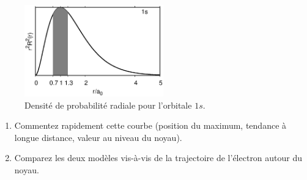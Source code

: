 \begin{figure}[h]
\begin{center}
\includegraphics[width=6cm]{figure/area_1s_3.eps}
\caption{Densit\'e de probabilit\'e radiale pour l'orbitale $1s$.}
\label{dens_prop}
\end{center}
\end{figure}

\begin{enumerate}
\item Commentez rapidement cette courbe (position du maximum, tendance à longue distance, valeur au niveau du noyau).
\item Comparez les deux mod\`eles vis-\`a-vis de la trajectoire de l'\'electron autour du noyau. 
\end{enumerate}

